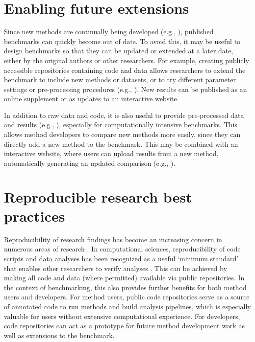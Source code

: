 \documentclass[12pt, a4paper]{article}
\begin{document}
\section*{Enabling future extensions}

Since new methods are continually being developed (e.g., \citep{Zappia2018}), published benchmarks can quickly become out of date. To avoid this, it may be useful to design benchmarks so that they can be updated or extended at a later date, either by the original authors or other researchers. For example, creating publicly accessible repositories containing code and data allows researchers to extend the benchmark to include new methods or datasets, or to try different parameter settings or pre-processing procedures (e.g., \citep{Saelens2018a, Saelens2018b, Duo2018, Soneson2018, Weber2016}). New results can be published as an online supplement or as updates to an interactive website.

In addition to raw data and code, it is also useful to provide pre-processed data and results (e.g., \citep{Duo2018}), especially for computationally intensive benchmarks. This allows method developers to compare new methods more easily, since they can directly add a new method to the benchmark. This may be combined with an interactive website, where users can upload results from a new method, automatically generating an updated comparison (e.g., \citep{Kanitz2015}).




\section*{Reproducible research best practices}

Reproducibility of research findings has become an increasing concern in numerous areas of research \citep{Ioannidis2005}. In computational sciences, reproducibility of code scripts and data analyses has been recognized as a useful `minimum standard' that enables other researchers to verify analyses \citep{Peng2011}. This can be achieved by making all code and data (where permitted) available via public repositories. In the context of benchmarking, this also provides further benefits for both method users and developers. For method users, public code repositories serve as a source of annotated code to run methods and build analysis pipelines, which is especially valuable for users without extensive computational experience. For developers, code repositories can act as a prototype for future method development work as well as extensions to the benchmark.
\end{document}
